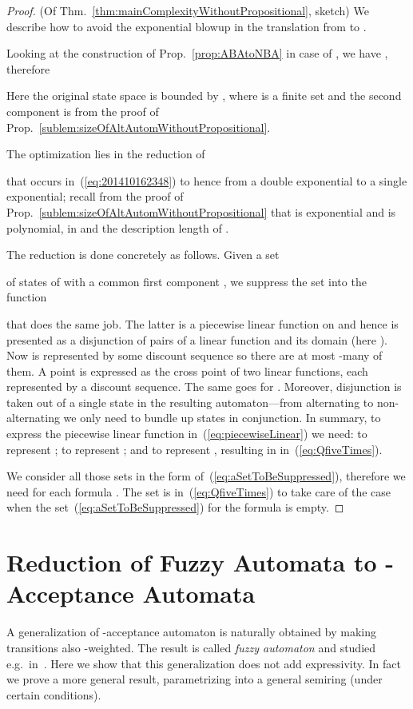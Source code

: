 \documentclass[a4paper,USenglish,numberwithinsect]{lipics}
\theoremstyle{definition}
\theoremstyle{remark}
\theoremstyle{plain}
\begin{document}
\begin{proof} (Of Thm.~\ref{thm:mainComplexityWithoutPropositional}, sketch) 
 We describe how to avoid 
the exponential blowup in the translation from 
 to  .

 Looking at the construction of Prop.~\ref{prop:ABAtoNBA} in case of
 , we have , therefore

Here the original state space  is bounded by 
 , where
  is a finite set and the second component 
 is from the
 proof of Prop.~\ref{sublem:sizeOfAltAutomWithoutPropositional}.

The optimization lies in the reduction of

that occurs in~(\ref{eq:201410162348}) to 
 hence from a double exponential to a single
 exponential; 
recall from the proof  
 of Prop.~\ref{sublem:sizeOfAltAutomWithoutPropositional} that  is exponential and  is polynomial, in  and the
 description length of . 

The reduction is done concretely
 as follows. Given a set 

 of states of  with a common first component , we suppress the
 set into the
 function 
 
  that does the same job. The latter is a piecewise linear function on
  and hence is presented as a disjunction of pairs  of  a linear function  and its domain (here ). Now  is represented by some discount sequence
 so
 there are at most -many of them. A point   is expressed as the cross point of two linear functions,
 each represented by a discount sequence.
The same goes for . 
 Moreover, disjunction is taken out of a single state in the resulting
 automaton---from alternating to non-alternating we only need to bundle
 up states in conjunction. 
In summary, to express 
 the piecewise linear function in~(\ref{eq:piecewiseLinear}) we need:  to
 represent ;  to represent ; and
 to represent , resulting in 
 in~(\ref{eq:QfiveTimes}). 

 We consider all those sets in the form
 of~(\ref{eq:aSetToBeSuppressed}), therefore we need 
 for each formula . The set  is in~(\ref{eq:QfiveTimes}) to take
 care of the case when the set~(\ref{eq:aSetToBeSuppressed}) for the
 formula  is empty.
\end{proof}


\section{Reduction of Fuzzy Automata to -Acceptance Automata}
\label{appendix:fuzzyAndZeroOne}
A generalization of -acceptance automaton
  is naturally obtained by making transitions also
-weighted. The result is called \emph{fuzzy automaton}
  and studied e.g.\ in~\cite{Rahonis05}.
  Here we show that this generalization does not add expressivity. In
  fact we prove a more general result, parametrizing 
  into a general semiring 
   (under certain conditions).
\end{document}
